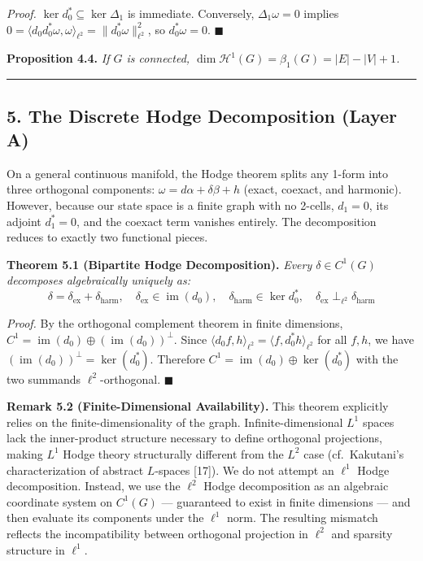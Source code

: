 \documentclass[
]{article}
\begin{document}
\emph{Proof.} \(\ker d_0^* \subseteq \ker \Delta_1\) is immediate.
Conversely, \(\Delta_1 \omega = 0\) implies
\(0 = \langle d_0 d_0^* \omega, \omega \rangle_{\ell^2} = \|d_0^* \omega\|_{\ell^2}^2\),
so \(d_0^* \omega = 0\). \(\blacksquare\)

\textbf{Proposition 4.4.} \emph{If \(G\) is connected,
\(\dim \mathcal{H}^1(G) = \beta_1(G) = |E| - |V| + 1\).}

\begin{center}\rule{0.5\linewidth}{0.5pt}\end{center}

\subsection{\texorpdfstring{5. The Discrete Hodge Decomposition
\textbf{(Layer
A)}}{5. The Discrete Hodge Decomposition (Layer A)}}\label{the-discrete-hodge-decomposition-layer-a}

On a general continuous manifold, the Hodge theorem splits any 1-form
into three orthogonal components:
\(\omega = d\alpha + \delta \beta + h\) (exact, coexact, and harmonic).
However, because our state space is a finite graph with no 2-cells,
\(d_1 = 0\), its adjoint \(d_1^* = 0\), and the coexact term vanishes
entirely. The decomposition reduces to exactly two functional pieces.

\textbf{Theorem 5.1 (Bipartite Hodge Decomposition).} \emph{Every
\(\delta \in C^1(G)\) decomposes algebraically uniquely as:}
\[ \delta = \delta_{\text{ex}} + \delta_{\text{harm}}, \quad \delta_{\text{ex}} \in \operatorname{im}(d_0), \quad \delta_{\text{harm}} \in \ker d_0^*, \quad \delta_{\text{ex}} \perp_{\ell^2} \delta_{\text{harm}} \]

\emph{Proof.} By the orthogonal complement theorem in finite dimensions,
\(C^1 = \operatorname{im}(d_0) \oplus (\operatorname{im}(d_0))^\perp\).
Since
\(\langle d_0 f, h \rangle_{\ell^2} = \langle f, d_0^* h \rangle_{\ell^2}\)
for all \(f, h\), we have
\((\operatorname{im}(d_0))^\perp = \ker(d_0^*)\). Therefore
\(C^1 = \operatorname{im}(d_0) \oplus \ker(d_0^*)\) with the two
summands \(\ell^2\)-orthogonal. \(\blacksquare\)

\textbf{Remark 5.2 (Finite-Dimensional Availability).} This theorem
explicitly relies on the finite-dimensionality of the graph.
Infinite-dimensional \(L^1\) spaces lack the inner-product structure
necessary to define orthogonal projections, making \(L^1\) Hodge theory
structurally different from the \(L^2\) case (cf.~Kakutani's
characterization of abstract \(L\)-spaces {[}17{]}). We do not attempt
an \(\ell^1\) Hodge decomposition. Instead, we use the \(\ell^2\) Hodge
decomposition as an algebraic coordinate system on \(C^1(G)\) ---
guaranteed to exist in finite dimensions --- and then evaluate its
components under the \(\ell^1\) norm. The resulting mismatch reflects
the incompatibility between orthogonal projection in \(\ell^2\) and
sparsity structure in \(\ell^1\).
\end{document}
